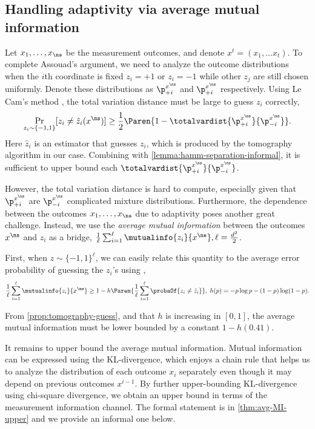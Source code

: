 \subsection{Handling adaptivity via average mutual information}
Let $x_1, \ldots, x_{\ns}$ be the measurement outcomes, and denote $x^t=(x_1, \ldots x_t)$. To complete Assouad's argument, we need to analyze the outcome distributions when the $i$th coordinate is fixed $z_i=+1$ or $z_i=-1$ while other $z_j$ are still chosen uniformly. Denote these distributions as $\p_{+i}^{x^{\ns}}$ and  $\p_{+i}^{x^{\ns}}$ respectively. Using Le Cam's method \cite{LeCam73,yu1997assouad}, the total variation distance must be large to guess $z_i$ correctly,
\[
\Pr_{z_i\sim \{-1,1\}}[z_i\ne \hat{z}_i(x^\ns)]\ge \frac{1}{2}\Paren{1-\totalvardist{\p_{+i}^{x^{\ns}}}{\p_{-i}^{x^{\ns}}}}.
\]
Here $\hat{z}_i$ is an estimator that guesses $z_i$, which is produced by the tomography algorithm in our case. 
Combining with \cref{lemma:hamm-separation-informal}, it is sufficient to upper bound each $\totalvardist{\p_{+i}^{x^{\ns}}}{\p_{-i}^{x^{\ns}}}$. 

However, the total variation distance is hard to compute, especially given that $\p_{+i}^{x^{\ns}}$ are $\p_{-i}^{x^{\ns}}$ complicated mixture distributions.
Furthermore, the dependence between the outcomes $x_1, \ldots, x_{\ns}$ due to adaptivity poses another great challenge. Instead, we use the \emph{average mutual information} \cite{ACLST22iiuic} between the outcomes $x^\ns$ and $z_i$ as a bridge,
$\frac{1}{\ell}\sum_{i=1}^{\ell}\mutualinfo{z_i}{x^\ns}, \ell=\frac{\dims^2}{2}$.

First, when $z\sim \{-1, 1\}^{\ell}$, we can easily relate this quantity to the average error probability of guessing the $z_i$'s using \cite[Lemma 10]{ACLST22iiuic},
\begin{equation}
    \frac{1}{\ell}\sum_{i=1}^{\ell}\mutualinfo{z_i}{x^\ns}\ge 1-h\Paren{\frac{1}{\ell}\sum_{i=1}^\ell\probaOf{z_i\ne\hat{z}_i}}, \;h(p)=-p\log p-(1-p)\log(1-p).
    \label{equ:avg-MI-lower}
\end{equation}

From \cref{prop:tomography-guess}, and that $h$ is increasing in $[0, 1]$, the average mutual information must be lower bounded by a constant $1-h(0.41)$.

It remains to upper bound the average mutual information. Mutual information can be expressed using the KL-divergence, which enjoys a chain rule that helps us to analyze the distribution of each outcome $x_i$ separately even though it may depend on previous outcomes $x^{i-1}$. By further upper-bounding KL-divergence using chi-square divergence, we obtain an upper bound in terms of the measurement information channel. The formal statement is in \cref{thm:avg-MI-upper} and we provide an informal one below.

